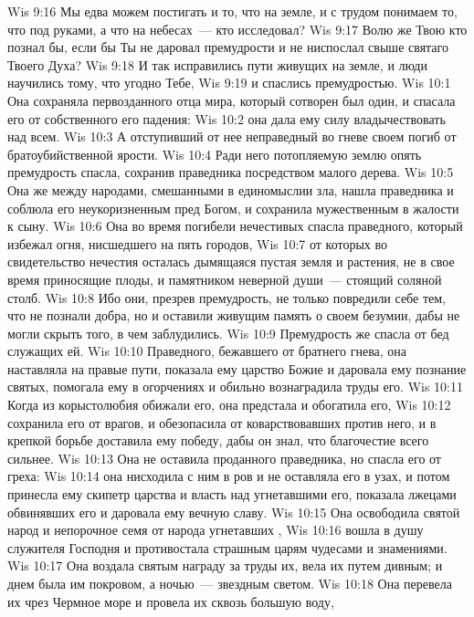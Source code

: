 \vs Wis 9:16 Мы едва можем постигать и то, что на земле, и с трудом понимаем то, что под руками, а что на небесах~--- кто исследовал?
\vs Wis 9:17 Волю же Твою кто познал бы, если бы Ты не даровал премудрости и не ниспослал свыше святаго Твоего Духа?
\vs Wis 9:18 И так исправились пути живущих на земле, и люди научились тому, что угодно Тебе,
\vs Wis 9:19 и спаслись премудростью.
\vs Wis 10:1 Она сохраняла первозданного отца мира, который сотворен был один, и спасала его от собственного его падения:
\vs Wis 10:2 она дала ему силу владычествовать над всем.
\vs Wis 10:3 А отступивший от нее неправедный во гневе своем погиб от братоубийственной ярости.
\vs Wis 10:4 Ради него потопляемую землю опять премудрость спасла, сохранив праведника посредством малого дерева.
\vs Wis 10:5 Она же между народами, смешанными в единомыслии зла, нашла праведника и соблюла его неукоризненным пред Богом, и сохранила мужественным в жалости к сыну.
\vs Wis 10:6 Она во время погибели нечестивых спасла праведного, который избежал огня, нисшедшего на пять городов,
\vs Wis 10:7 от которых во свидетельство нечестия осталась дымящаяся пустая земля и растения, не в свое время приносящие плоды, и памятником неверной души~--- стоящий соляной столб.
\vs Wis 10:8 Ибо они, презрев премудрость, не только повредили себе тем, что не познали добра, но и оставили живущим память о своем безумии, дабы не могли скрыть того, в чем заблудились.
\vs Wis 10:9 Премудрость же спасла от бед служащих ей.
\vs Wis 10:10 Праведного, бежавшего от братнего гнева, она наставляла на правые пути, показала ему царство Божие и даровала ему познание святых, помогала ему в огорчениях и обильно вознаградила труды его.
\vs Wis 10:11 Когда из корыстолюбия обижали его, она предстала и обогатила его,
\vs Wis 10:12 сохранила его от врагов, и обезопасила от коварствовавших против него, и в крепкой борьбе доставила ему победу, дабы он знал, что благочестие всего сильнее.
\vs Wis 10:13 Она не оставила проданного праведника, но спасла его от греха:
\vs Wis 10:14 она нисходила с ним в ров и не оставляла его в узах, и потом принесла ему скипетр царства и власть над угнетавшими его, показала лжецами обвинявших его и даровала ему вечную славу.
\vs Wis 10:15 Она освободила святой народ и непорочное семя от народа угнетавших ,
\vs Wis 10:16 вошла в душу служителя Господня и противостала страшным царям чудесами и знамениями.
\vs Wis 10:17 Она воздала святым награду за труды их, вела их путем дивным; и днем была им покровом, а ночью~--- звездным светом.
\vs Wis 10:18 Она перевела их чрез Чермное море и провела их сквозь большую воду,
